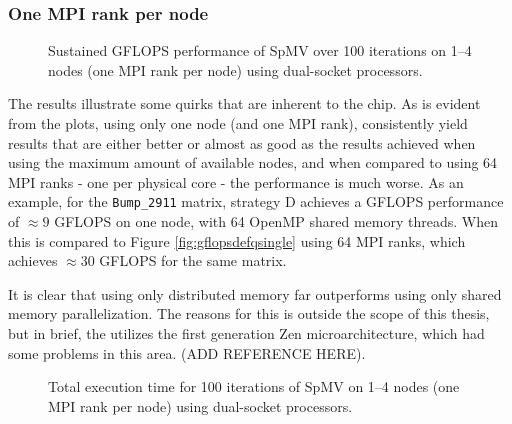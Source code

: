 \subsubsection{One MPI rank per node}
\begin{figure}[H]
    \centering
    \caption{Sustained GFLOPS performance of SpMV over 100 iterations on 1–4 nodes (one MPI rank per node) using dual-socket  processors.}
    \label{fig:gflopsdefqmulti}
\end{figure}
\medskip

The results illustrate some quirks that are inherent to the  chip. As is evident from the plots, using only one node (and one MPI rank), consistently yield results that are either better or almost as good as the results achieved when using the maximum amount of available nodes, and when compared to using 64 MPI ranks - one per physical core - the performance is much worse. As an example, for the \texttt{Bump\_2911} matrix, strategy D achieves a GFLOPS performance of \(\approx 9\) GFLOPS on one node, with 64 OpenMP shared memory threads. When this is compared to Figure \ref{fig:gflopsdefqsingle} using 64 MPI ranks, which achieves \(\approx 30\) GFLOPS for the same matrix.
\medskip

It is clear that using only distributed memory far outperforms using only shared memory parallelization. The reasons for this is outside the scope of this thesis, but in brief, the  utilizes the first generation Zen microarchitecture, which had some problems in this area. (ADD REFERENCE HERE).


\begin{figure}[H]
    \centering
    \caption{Total execution time for 100 iterations of SpMV on 1–4 nodes (one MPI rank per node) using dual-socket  processors.}
    \label{fig:tcdefqmulti}
\end{figure}

